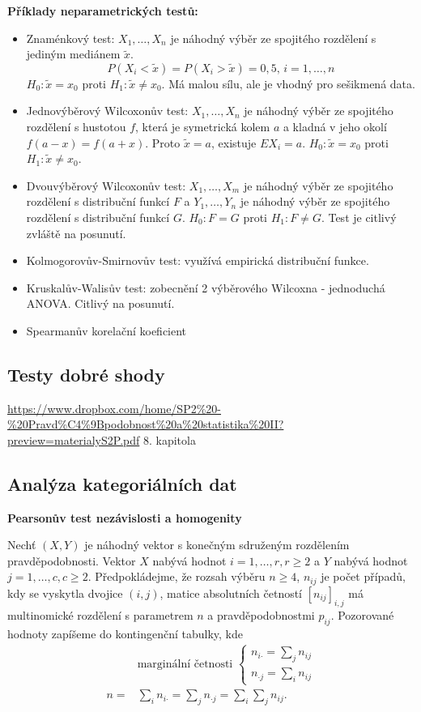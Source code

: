 \textbf{Příklady neparametrických testů:} \begin{itemize}
\item Znaménkový test: $X_1,\ldots,X_n$ je náhodný výběr ze spojitého rozdělení s jediným mediánem $\tilde{x}$. $$P\left(X_i < \tilde{x} \right) = P\left(X_i > \tilde{x} \right) = 0,5,\, i=1,\ldots, n$$ $H_0: \tilde{x} = x_0$ proti $H_1: \tilde{x} \neq x_0$. Má malou sílu, ale je vhodný pro sešikmená data. 
\item Jednovýběrový Wilcoxonův test: $X_1,\ldots,X_n$ je náhodný výběr ze spojitého rozdělení s hustotou $f$, která je symetrická kolem $a$ a kladná v jeho okolí $f\left(a-x\right)=f\left(a+x\right)$. Proto $\tilde{x}=a$, existuje $EX_i = a$. $H_0: \tilde{x} = x_0$ proti $H_1: \tilde{x} \neq x_0$. 
\item Dvouvýběrový Wilcoxonův test: $X_1,\ldots,X_m$ je náhodný výběr ze spojitého rozdělení s distribuční funkcí $F$ a $Y_1,\ldots,Y_n$ je náhodný výběr ze spojitého rozdělení s distribuční funkcí $G$. $H_0: F = G$ proti $H_1: F \neq G$. Test je citlivý zvláště na posunutí.
\item Kolmogorovův-Smirnovův test: využívá empirická distribuční funkce. 
\item Kruskalův-Walisův test: zobecnění 2 výběrového Wilcoxna - jednoduchá ANOVA. Citlivý na posunutí.
\item Spearmanův korelační koeficient
\end{itemize}
\subsection{Testy dobré shody}
\url{https://www.dropbox.com/home/SP2\%20-\%20Pravd\%C4\%9Bpodobnost\%20a\%20statistika\%20II?preview=materialyS2P.pdf}
8. kapitola

\subsection{Analýza kategoriálních dat}
\textbf{Pearsonův test nezávislosti a homogenity}

Nechť $(X,Y)$ je náhodný vektor s konečným sdruženým rozdělením pravděpodobnosti. Vektor $X$ nabývá hodnot $i = 1, \ldots, r, r \geq 2$ a $Y$ nabývá hodnot $j = 1, \ldots, c, c \geq 2$. Předpokládejme, že rozsah výběru $n \geq 4$, $n_{ij}$ je počet případů, kdy se vyskytla dvojice $(i, j)$, matice absolutních četností $[n_{ij}]_{i,j}$ má multinomické rozdělení s parametrem $n$ a pravděpodobnostmi $p_{ij}$. Pozorované hodnoty zapíšeme do kontingenční tabulky, kde
\begin{align*}
& \text{marginální četnosti }
\begin{cases}
n_{i \boldsymbol{\cdot}} = \sum_j n_{ij}\\
n_{\boldsymbol{\cdot} j} = \sum_i n_{ij}
\end{cases} \\
n =& \sum_i n_{i \boldsymbol{\cdot}} = \sum_j n_{\boldsymbol{\cdot} j} = \sum_i \sum_j n_{ij}.
\end{align*}

